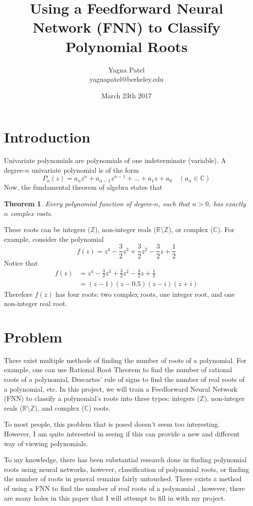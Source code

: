 \documentclass{article}
\title{Using a Feedforward Neural Network (FNN) to Classify Polynomial Roots}
\author{Yagna Patel \\ yagnapatel@berkeley.edu}
\date{March 23th 2017}
\newtheorem{theorem}{Theorem}
\begin{document}
\maketitle

\section{Introduction}
Univariate polynomials are polynomials of one indeterminate (variable). A degree-$n$ univariate polynomial is of the form $$P_n(z) = a_nz^n + a_{n-1}z^{n-1} + \ldots + a_1z + a_0\quad (a_n\in\mathbb{C})$$ Now, the fundamental theorem of algebra states that \begin{theorem}Every polynomial function of degree-$n$, such that $n>0$, has exactly $n$ complex roots.\end{theorem} \noindent These roots can be integers ($\mathbb{Z}$), non-integer reals ($\mathbb{R}\setminus\mathbb{Z}$), or complex ($\mathbb{C}$). For example, consider the polynomial $$f(z) = z^4-\frac{3}{2}z^3+\frac{3}{2}z^2-\frac{3}{2}z+\frac{1}{2}$$ Notice that \begin{align*}f(z) &= z^4-\frac{3}{2}z^3+\frac{3}{2}z^2-\frac{3}{2}z+\frac{1}{2} \\&= (z-1)(z-0.5)(z-i)(z+i)\end{align*} Therefore $f(z)$ has four roots: two complex roots, one integer root, and one non-integer real root.

\section{Problem}
There exist multiple methods of finding the number of roots of a polynomial. For example, one can use Rational Root Theorem to find the number of rational roots of a polynomial, Descartes' rule of signs to find the number of real roots of a polynomial, etc. In this project, we will train a Feedforward Neural Network (FNN) to classify a polynomial's roots into three types: integers ($\mathbb{Z}$), non-integer reals ($\mathbb{R}\setminus\mathbb{Z}$), and complex ($\mathbb{C}$) roots. 
\vspace{4pt}

\noindent To most people, this problem that is posed doesn't seem too interesting. However, I am quite interested in seeing if this can provide a new and different way of viewing polynomials. 

\vspace{4pt}

\noindent To my knowledge, there has been substantial research done in finding polynomial roots using neural networks, however, classification of polynomial roots, or finding the number of roots in general remains fairly untouched. There exists a method of using a FNN to find the number of real roots of a polynomial \cite{real_roots}, however, there are many holes in this paper that I will attempt to fill in with my project. 
\end{document}
